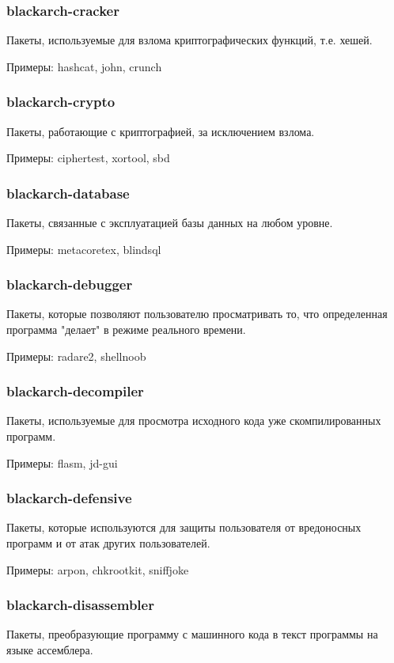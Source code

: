 \documentclass[a4paper, oneside, 11pt]{book}
\begin{document}
\subsubsection{blackarch-cracker}
Пакеты, используемые для взлома криптографических функций, т.е. хешей.

Примеры: hashcat, john, crunch

\subsubsection{blackarch-crypto}
Пакеты, работающие с криптографией, за исключением взлома.

Примеры: ciphertest, xortool, sbd

\subsubsection{blackarch-database}
Пакеты, связанные с эксплуатацией базы данных на любом уровне.

Примеры: metacoretex, blindsql

\subsubsection{blackarch-debugger}
Пакеты, которые позволяют пользователю просматривать то, 
что определенная программа "делает" в режиме реального времени.

Примеры: radare2, shellnoob

\subsubsection{blackarch-decompiler}
Пакеты, используемые для просмотра исходного кода уже скомпилированных программ.

Примеры: flasm, jd-gui

\subsubsection{blackarch-defensive}
Пакеты, которые используются для защиты пользователя от вредоносных программ
и от атак других пользователей.

Примеры: arpon, chkrootkit, sniffjoke

\subsubsection{blackarch-disassembler}
Пакеты, преобразующие программу с машинного кода в текст программы на 
языке ассемблера.
\end{document}
